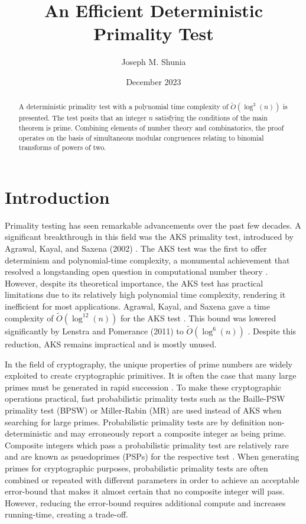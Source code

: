 \documentclass{article}
\title{An Efficient Deterministic Primality Test}
\author{Joseph M. Shunia}
\date{December 2023}
\theoremstyle{plain}
\theoremstyle{definition}
\begin{document}
\maketitle

\begin{abstract}
A deterministic primality test with a polynomial time complexity of $\tilde{O}(\log^3(n))$ is presented. The test posits that an integer $n$ satisfying the conditions of the main theorem is prime. Combining elements of number theory and combinatorics, the proof operates on the basis of simultaneous modular congruences relating to binomial transforms of powers of two.
\end{abstract}

\section{Introduction}

Primality testing has seen remarkable advancements over the past few decades. A significant breakthrough in this field was the AKS primality test, introduced by Agrawal, Kayal, and Saxena (2002) \cite{aks2002}. The AKS test was the first to offer determinism and polynomial-time complexity, a monumental achievement that resolved a longstanding open question in computational number theory \cite{goldreich2008}. However, despite its theoretical importance, the AKS test has practical limitations due to its relatively high polynomial time complexity, rendering it inefficient for most applications. Agrawal, Kayal, and Saxena gave a time complexity of $\tilde{O}(\log^{12}(n))$ for the AKS test \cite{aks2002}. This bound was lowered significantly by Lenstra and Pomerance (2011) to $\tilde{O}(\log^6(n))$ \cite{lenstra2011}. Despite this reduction, AKS remains impractical and is mostly unused.

In the field of cryptography, the unique properties of prime numbers are widely exploited to create cryptographic primitives. It is often the case that many large primes must be generated in rapid succession \cite{lenstra1987}. To make these cryptographic operations practical, fast probabilistic primality tests such as the Baille-PSW primality test (BPSW) \cite{baillie1980} or Miller-Rabin (MR) \cite{rabin1980} \cite{miller1976} are used instead of AKS when searching for large primes. Probabilistic primality tests are by definition non-deterministic and may erroneously report a composite integer as being prime. Composite integers which pass a probabilistic primality test are relatively rare and are known as psuedoprimes (PSPs) for the respective test \cite{wagstaff1983}. When generating primes for cryptographic purposes, probabilistic primality tests are often combined or repeated with different parameters in order to achieve an acceptable error-bound that makes it almost certain that no composite integer will pass. However, reducing the error-bound requires additional compute and increases running-time, creating a trade-off.
\end{document}

